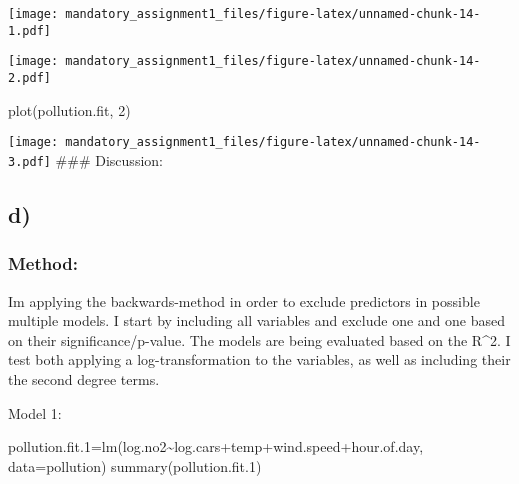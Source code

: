 \documentclass[
]{article}
\newenvironment{Shaded}{\begin{snugshade}}{\end{snugshade}}
\newcommand{\AttributeTok}[1]{\textcolor[rgb]{0.77,0.63,0.00}{#1}}
\newcommand{\DecValTok}[1]{\textcolor[rgb]{0.00,0.00,0.81}{#1}}
\newcommand{\FloatTok}[1]{\textcolor[rgb]{0.00,0.00,0.81}{#1}}
\newcommand{\FunctionTok}[1]{\textcolor[rgb]{0.00,0.00,0.00}{#1}}
\newcommand{\NormalTok}[1]{#1}
\newcommand{\OtherTok}[1]{\textcolor[rgb]{0.56,0.35,0.01}{#1}}
\newcommand{\SpecialCharTok}[1]{\textcolor[rgb]{0.00,0.00,0.00}{#1}}
\begin{document}
\texttt{[image: mandatory\_assignment1\_files/figure-latex/unnamed-chunk-14-1.pdf]}

\begin{Shaded}
\end{Shaded}

\texttt{[image: mandatory\_assignment1\_files/figure-latex/unnamed-chunk-14-2.pdf]}

\begin{Shaded}
\begin{Highlighting}[]
\FunctionTok{plot}\NormalTok{(pollution.fit, }\DecValTok{2}\NormalTok{)}
\end{Highlighting}
\end{Shaded}

\texttt{[image: mandatory\_assignment1\_files/figure-latex/unnamed-chunk-14-3.pdf]}
\#\#\# Discussion:

\hypertarget{d}{%
\subsection{d)}\label{d}}

\hypertarget{method-3}{%
\subsubsection{Method:}\label{method-3}}

Im applying the backwards-method in order to exclude predictors in
possible multiple models. I start by including all variables and exclude
one and one based on their significance/p-value. The models are being
evaluated based on the R\^{}2. I test both applying a log-transformation
to the variables, as well as including their the second degree terms.

Model 1:

\begin{Shaded}
\begin{Highlighting}[]
\NormalTok{pollution.fit}\FloatTok{.1}\OtherTok{=}\FunctionTok{lm}\NormalTok{(log.no2}\SpecialCharTok{\textasciitilde{}}\NormalTok{log.cars}\SpecialCharTok{+}\NormalTok{temp}\SpecialCharTok{+}\NormalTok{wind.speed}\SpecialCharTok{+}\NormalTok{hour.of.day, }\AttributeTok{data=}\NormalTok{pollution)}
\FunctionTok{summary}\NormalTok{(pollution.fit}\FloatTok{.1}\NormalTok{)}
\end{Highlighting}
\end{Shaded}
\end{document}
